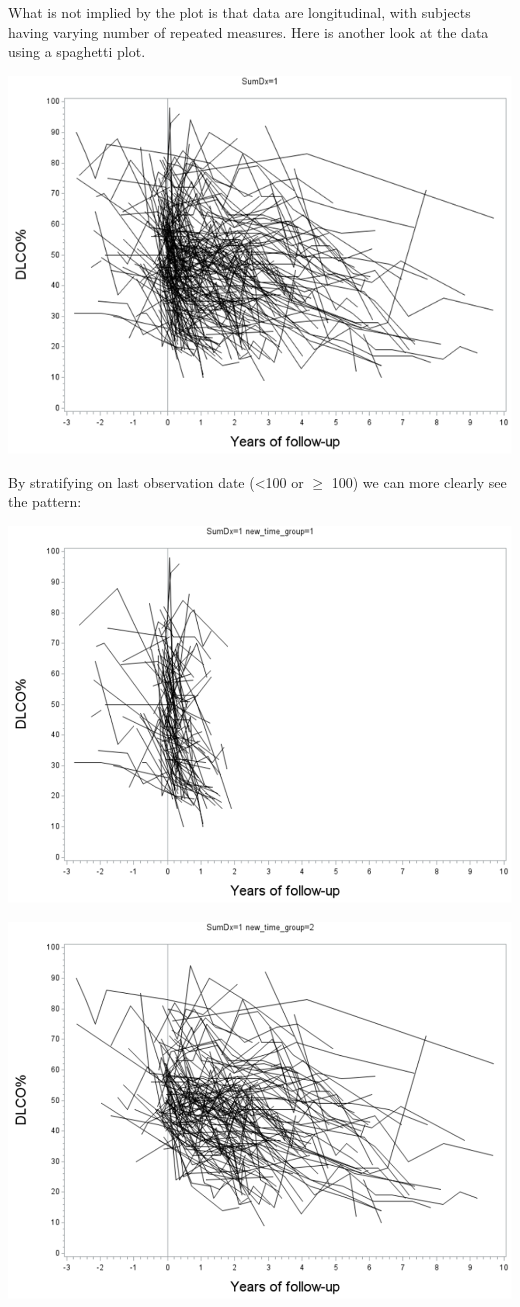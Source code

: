 \documentclass[
  9pt,
  ignorenonframetext,
]{beamer}
\begin{document}
\begin{frame}{}
\protect\hypertarget{section-7}{}
What is not implied by the plot is that data are longitudinal, with
subjects having varying number of repeated measures. Here is another
look at the data using a spaghetti plot.

\begin{center}\includegraphics[width=0.7\linewidth]{figs_L20/f7} \end{center}
\end{frame}

\begin{frame}{}
\protect\hypertarget{section-8}{}
By stratifying on last observation date (\textless100 or \(\geq\) 100)
we can more clearly see the pattern:

\begin{center}\includegraphics[width=0.7\linewidth]{figs_L20/f8} \end{center}

\begin{center}\includegraphics[width=0.7\linewidth]{figs_L20/f9} \end{center}
\end{frame}
\end{document}
